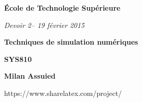 \documentclass[a4paper,12pt,fleqn]{article}
\newcommand{\institution}{École de Technologie Supérieure}
\newcommand{\titlehd}{Techniques de simulation numériques}
\newcommand{\examtype}{Devoir 2}
\newcommand{\examdate}{19 février 2015}
\newcommand{\examcode}{SYS810}
\newcommand{\authors}{Milan Assuied}
\begin{document}

\begin{center}
\large\textbf{\institution}
\end{center}
\vspace{1cm}

\begin{center}
\textit{ \examtype -- \examdate}
\end{center}
\vspace{1cm}

\begin{center}
\large\textbf{\titlehd}
\end{center}

\begin{center}
\large\textbf{\examcode}
\end{center}
\begin{center}
\large\textbf{\authors}
\end{center}https://www.sharelatex.com/project/
\vspace{4cm}




\newpage
\end{document}
